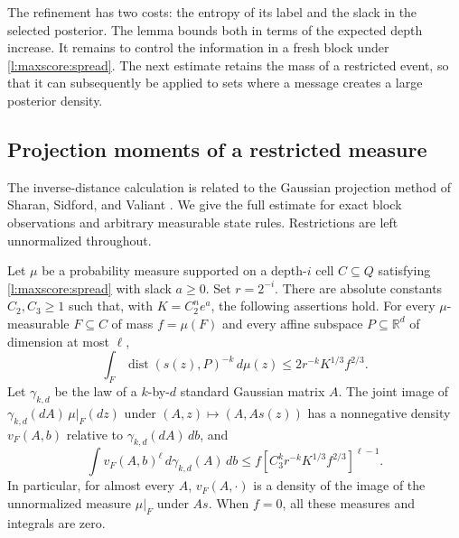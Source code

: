 The refinement has two costs: the entropy of its label and the slack
in the selected posterior. The lemma bounds both in terms of the
expected depth increase. It remains to control the information in a
fresh block under \eqref{l:maxscore:spread}. The next estimate retains
the mass of a restricted event, so that it can subsequently be applied
to sets where a message creates a large posterior density.

\subsection{Projection moments of a restricted measure}

The inverse-distance calculation is related to the Gaussian projection
method of Sharan, Sidford, and Valiant \cite{SSV2019}. We give the
full estimate for exact block observations and arbitrary measurable
state rules. Restrictions are left unnormalized throughout.

\begin{lemma}\label{l:maxscore:projection}
Let \(\mu\) be a probability measure supported on a depth-\(i\)
cell \(C\subseteq Q\) satisfying \eqref{l:maxscore:spread}
with slack \(a\ge0\).
Set \(r=2^{-i}\).  There are absolute constants \(C_2,C_3\ge1\)
such that, with \(K=C_2^ne^a\), the following assertions hold.
For every \(\mu\)-measurable \(F\subseteq C\) of mass \(f=\mu(F)\)
and every affine subspace \(P\subseteq\mathbb R^d\) of dimension at
most \(\ell\),
\begin{equation}\label{l:maxscore:fractional}
 \int_F\operatorname{dist}(s(z),P)^{-k}\,d\mu(z)
 \le 2r^{-k}K^{1/3}f^{2/3}.
\end{equation}
Let \(\gamma_{k,d}\) be the law of a \(k\)-by-\(d\) standard
Gaussian matrix \(A\).  The joint image of
\(\gamma_{k,d}(dA)\,\mu|_F(dz)\) under
\((A,z)\mapsto(A,As(z))\) has a nonnegative density \(v_F(A,b)\)
relative to \(\gamma_{k,d}(dA)\,db\), and
\begin{equation}\label{l:maxscore:moment}
 \int v_F(A,b)^\ell\,d\gamma_{k,d}(A)\,db
 \le f\left[C_3^k r^{-k}K^{1/3}f^{2/3}\right]^{\ell-1}.
\end{equation}
In particular, for almost every \(A\), \(v_F(A,\cdot)\) is a density
of the image of the unnormalized measure \(\mu|_F\) under \(As\).
When \(f=0\), all these measures and integrals are zero.
\end{lemma}

